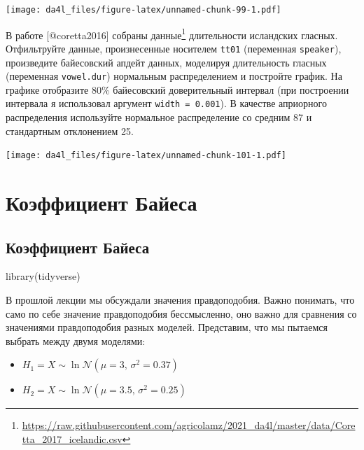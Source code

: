 \documentclass[
]{book}
\makeatletter
\newenvironment{Shaded}{\begin{snugshade}}{\end{snugshade}}
\newcommand{\FunctionTok}[1]{\textcolor[rgb]{0.00,0.00,0.00}{#1}}
\newcommand{\NormalTok}[1]{#1}
\providecommand{\tightlist}{%
  \setlength{\itemsep}{0pt}\setlength{\parskip}{0pt}}
\renewcommand{\href}[2]{#2\footnote{\url{#1}}}
\newenvironment{kframe}{%
    \medskip{}
    \setlength{\fboxsep}{.8em}
    \def\at@end@of@kframe{}%
    \ifinner\ifhmode%
    \def\at@end@of@kframe{\end{minipage}}%
    \begin{minipage}{\columnwidth}%
    \fi\fi%
    \def\FrameCommand##1{\hskip\@totalleftmargin \hskip-\fboxsep
    \colorbox{shadecolor}{##1}\hskip-\fboxsep
        \hskip-\linewidth \hskip-\@totalleftmargin \hskip\columnwidth}%
    \MakeFramed {\advance\hsize-\width
      \@totalleftmargin\z@ \linewidth\hsize
      \@setminipage}}%
  {\par\unskip\endMakeFramed%
    \at@end@of@kframe}
\newenvironment{rmdblock}[1]
  {
    \begin{itemize}
    \renewcommand{\labelitemi}{
      \raisebox{-.7\height}[0pt][0pt]{
        {\setkeys{Gin}{width=3em,keepaspectratio}\texttt{[image: images/\#1]}}
        }
        }
        \setlength{\fboxsep}{1em}
        \begin{kframe}
        \item
      }
      {
        \end{kframe}
        \end{itemize}
      }
\newenvironment{rmdtask}
      {\begin{rmdblock}{task}}
      {\end{rmdblock}}
\makeatother
\begin{document}
\texttt{[image: da4l\_files/figure-latex/unnamed-chunk-99-1.pdf]}

\begin{rmdtask}
В работе {[}@coretta2016{]} собраны
\href{https://raw.githubusercontent.com/agricolamz/2021_da4l/master/data/Coretta_2017_icelandic.csv}{данные}
длительности исландских гласных. Отфильтруйте данные, произнесенные
носителем \texttt{tt01} (переменная \texttt{speaker}), произведите
байесовский апдейт данных, моделируя длительность гласных (переменная
\texttt{vowel.dur}) нормальным распределением и постройте график. На
графике отобразите 80\% байесовский доверительный интервал (при
построении интервала я использовал аргумент \texttt{width\ =\ 0.001}). В
качестве априорного распределения используйте нормальное распределение
со средним 87 и стандартным отклонением 25.
\end{rmdtask}

\texttt{[image: da4l\_files/figure-latex/unnamed-chunk-101-1.pdf]}

\hypertarget{ux43aux43eux44dux444ux444ux438ux446ux438ux435ux43dux442-ux431ux430ux439ux435ux441ux430}{%
\chapter{Коэффициент Байеса}\label{ux43aux43eux44dux444ux444ux438ux446ux438ux435ux43dux442-ux431ux430ux439ux435ux441ux430}}

\hypertarget{ux43aux43eux44dux444ux444ux438ux446ux438ux435ux43dux442-ux431ux430ux439ux435ux441ux430-1}{%
\section{Коэффициент Байеса}\label{ux43aux43eux44dux444ux444ux438ux446ux438ux435ux43dux442-ux431ux430ux439ux435ux441ux430-1}}

\begin{Shaded}
\begin{Highlighting}[]
\FunctionTok{library}\NormalTok{(tidyverse)}
\end{Highlighting}
\end{Shaded}

В прошлой лекции мы обсуждали значения правдоподобия. Важно понимать, что само по себе значение правдоподобия бессмысленно, оно важно для сравнения со значениями правдоподобия разных моделей. Представим, что мы пытаемся выбрать между двумя моделями:

\begin{itemize}
\tightlist
\item
  \(H_1 = X \sim \ln\mathcal{N}(\mu = 3,\, \sigma^{2}= 0.37)\)
\item
  \(H_2 = X \sim \ln\mathcal{N}(\mu = 3.5,\, \sigma^{2}= 0.25)\)
\end{itemize}
\end{document}
